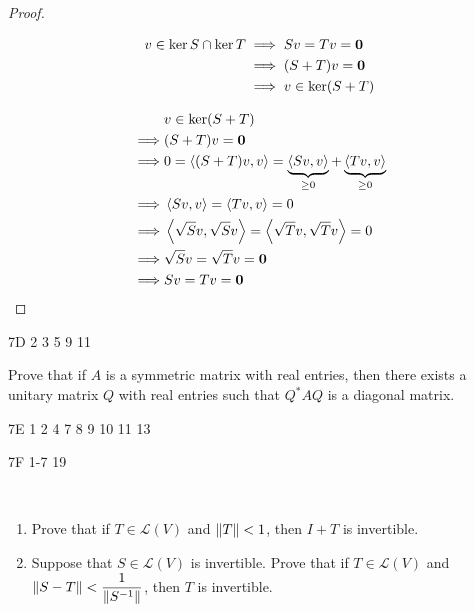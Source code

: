 \begin{proof} \

\fbox{$\supset$} 
\begin{align*}
v\in\ker S\cap\ker T
&\implies Sv=Tv=\vb{0}\\
&\implies(S+T)v=\vb{0}\\
&\implies v\in\ker(S+T)
\end{align*}

\fbox{$\subset$} 
\begin{align*}
&v\in\ker(S+T)\\
\implies&(S+T)v=\vb{0}\\
\implies&0=\left\langle(S+T)v,v\right\rangle=\underbrace{\left\langle Sv,v\right\rangle}_{\ge0}+\underbrace{\left\langle Tv,v\right\rangle}_{\ge0}\\
\implies&\left\langle Sv,v\right\rangle=\left\langle Tv,v\right\rangle=0\\
\implies&\left\langle\sqrt{S}v,\sqrt{S}v\right\rangle=\left\langle\sqrt{T}v,\sqrt{T}v\right\rangle=0\\
\implies&\sqrt{S}v=\sqrt{T}v=\vb{0}\\
\implies& Sv=Tv=\vb{0}
\end{align*}
\end{proof}

7D 2 3 5 9 11

\begin{exercise}
Prove that if $A$ is a symmetric matrix with real entries, then there exists a unitary matrix $Q$ with real entries such that $Q^*AQ$ is a diagonal matrix.
\end{exercise}

\begin{solution}

\end{solution}

7E 1 2 4 7 8 9 10 11 13

7F 1-7 19

\begin{exercise} \
\begin{enumerate}[label=(\roman*)]
\item Prove that if $T\in\mathcal{L}(V)$ and $\norm{T}<1$, then $I+T$ is invertible.
\item Suppose that $S\in\mathcal{L}(V)$ is invertible. Prove that if $T\in\mathcal{L}(V)$ and $\norm{S-T}<\dfrac{1}{\norm{S^{-1}}}$, then $T$ is invertible.
\end{enumerate}
\end{exercise}

